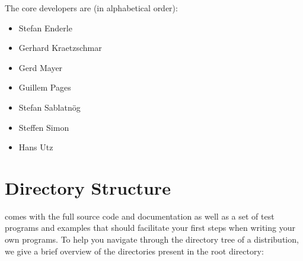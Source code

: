 \documentclass[10pt]{book}
\begin{document}
The \miro core developers are (in alphabetical order):
\begin{itemize}
  \item Stefan Enderle
  \item Gerhard Kraetzschmar
  \item Gerd Mayer
  \item Guillem Pages
  \item Stefan Sablatn\"og
  \item Steffen Simon
  \item Hans Utz
\end{itemize}

\section{\miro Directory Structure}

\miro comes with the full source code and documentation as well as a
set of test programs and examples that should facilitate your first
steps when writing your own programs. To help you navigate through the
directory tree of a \miro distribution, we give a brief overview of
the directories present in the \miro root directory:
\end{document}
